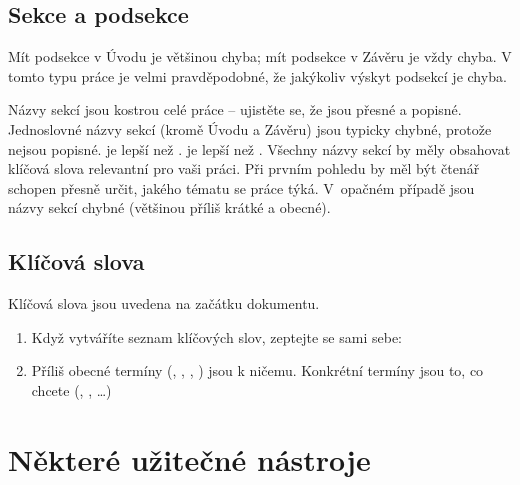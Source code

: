 \subsection{Sekce a podsekce}
\label{sec:Sections}

Mít podsekce v Úvodu je většinou chyba; mít podsekce v Závěru je vždy chyba. V tomto typu práce je velmi pravděpodobné, že jakýkoliv výskyt podsekcí je chyba. 

Názvy sekcí jsou kostrou celé práce -- ujistěte se, že jsou přesné a popisné. Jednoslovné názvy sekcí (kromě Úvodu a Závěru) jsou typicky chybné, protože nejsou popisné.
 je lepší než .
 je lepší než . Všechny názvy sekcí by měly obsahovat klíčová slova relevantní pro vaši práci. Při prvním pohledu by měl být čtenář schopen přesně určit, jakého tématu se práce týká. V~opačném případě jsou názvy sekcí chybné (většinou příliš krátké a obecné).

\subsection{Klíčová slova}
\label{sec:Keywords}

Klíčová slova jsou uvedena na začátku dokumentu.
\begin{enumerate}[noitemsep]
	\item Když vytváříte seznam klíčových slov, zeptejte se sami sebe: 
	\item Příliš obecné termíny (, , , ) jsou k ničemu. Konkrétní termíny jsou to, co chcete (, , \ldots)
\end{enumerate}

\section{Některé užitečné nástroje}
\label{sec:UsefulTools}

